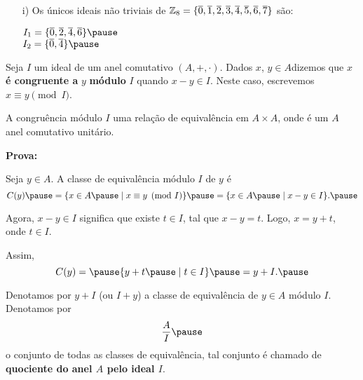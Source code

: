 \documentclass{beamer}
\begin{document}
    \begin{frame}
        \begin{exemplos}
            \begin{enumerate}
                \item[i)] Os {\'u}nicos ideais n{\~a}o triviais de \pause $\mathbb{Z}_8 = \{\overline{0}, \overline{1}, \overline{2}, \overline{3}, \overline{4}, \overline{5}, \overline{6}, \overline{7}\}$ s{\~a}o:\pause
                \begin{center}
                    $I_1 = \{\overline{0}, \overline{2}, \overline{4}, \overline{6}\}\pause$\\
                    $I_2 =\{\overline{0}, \overline{4}\}\pause$
                \end{center}
            \end{enumerate}
        \end{exemplos}
    \end{frame}

    \begin{frame}
        \begin{definicao}
            Seja $I$ um ideal \pause de um anel comutativo $(A, +, \cdot)$. \pause Dados $x$, $y \in A$\pause dizemos que $x$ \textbf{\'e congruente a} $y$ \pause \textbf{m\'odulo} $I$ \pause quando $x - y \in I$. \pause Neste caso, escrevemos $x\equiv y \pmod I$.\pause
        \end{definicao}

        \begin{proposicao}
            A congru{\^e}ncia m{\'o}dulo $I$  uma rela{\c c}{\~a}o de equival{\^e}ncia em $A \times A$, \pause onde é um $A$ anel comutativo unit{\'a}rio.\pause
        \end{proposicao}
        \noindent \textbf{Prova:}

        \vspace{3cm}
    \end{frame}

    \begin{frame}
        Seja $y \in A$. \pause A classe de equival{\^e}ncia m{\'o}dulo $I$ \pause de $y$ {\'e}\pause 
        \[
            C(y) \pause = \{x \in A \pause \mid x\equiv y \pmod I\} \pause = \{x \in A \pause \mid x - y \in I\}.\pause
        \]

        Agora, $x - y \in I$ \pause significa que existe $t \in I$, \pause tal que $x - y = t$. \pause Logo, $x = y + t$, \pause onde $t \in I$.\pause

        Assim,\pause
        \[
            C(y) = \pause \{y + t\pause \mid t \in I\} \pause = y + I.\pause
        \]

        \begin{observacao}
            Denotamos por $y + I$ \pause (ou $I + y$) \pause a classe de equival{\^e}ncia de $y \in A$ \pause m{\'o}dulo $I$. \pause Denotamos por \pause 
            \[
                \dfrac{A}{I}\pause 
            \]
            o conjunto de todas as classes de equival{\^e}ncia, \pause tal conjunto {\'e} chamado de \textbf{quociente do anel $A$ pelo ideal $I$}.\pause
        \end{observacao}
    \end{frame}
\end{document}
